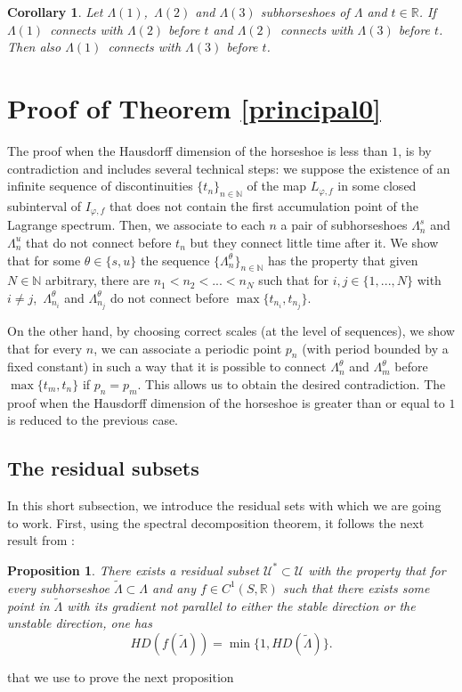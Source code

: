 \documentclass[12pt]{amsart}
\theoremstyle{plain} %
\newtheorem{proposition}[theorem]{Proposition}
\newtheorem{corollary}[theorem]{Corollary}
\theoremstyle{definition} %
\numberwithin{equation}{section}
\begin{document}
 \begin{corollary}\label{connection3}
 Let $\Lambda(1)$,\ $\Lambda(2)$ and $\Lambda(3)$ subhorseshoes of $\Lambda$ and $t\in \mathbb{R}$. If $\Lambda(1)$\ connects with $\Lambda(2)$ before $t$ and $\Lambda(2)$\ connects with $\Lambda(3)$ before $t$. Then also $\Lambda(1)$\ connects with $\Lambda(3)$ before $t$.
 \end{corollary}
 
\section{Proof of Theorem \ref{principal0}}

The proof when the Hausdorff dimension of the horseshoe is less than $1$, is by contradiction and includes several technical steps: we suppose the existence of an infinite sequence of discontinuities $\{t_n\}_{n\in\mathbb{N}}$ of the map $L_{\varphi, f}$ in some closed subinterval of $I_{\varphi,f}$ that does not contain the first accumulation point of the Lagrange spectrum. Then, we associate to each $n$ a pair of subhorseshoes 
$\Lambda^s_n$ and $\Lambda^u_n$ that do not connect before $t_n$ but they connect little time after it. We show that for some $\theta \in \{s,u\}$ the sequence $\{\Lambda^{\theta}_n\}_{n\in\mathbb{N}}$ has the property that given $N\in \mathbb{N}$ arbitrary, there are $n_1<n_2<...<n_N$ such that for $i,j\in  \{1,...,N \}$ with $i\neq j$,\ $\Lambda^{\theta}_{n_i}$ and $\Lambda^{\theta}_{n_j}$ do not connect before $\max \{ t_{n_i}, t_{n_j} \}.$ 

On the other hand, by choosing correct scales (at the level of sequences), we show that for every $n$, we can associate a periodic point $p_n$ (with period bounded by a fixed constant) in such a way that it is possible to connect $\Lambda^{\theta}_n$ and $\Lambda^{\theta}_m$ before $\max \{ t_m, t_n \}$ if $p_n=p_m$. This allows us to obtain the desired contradiction. The proof when the Hausdorff dimension of the horseshoe is greater than or equal to $1$ is reduced to the previous case.

\subsection{The residual subsets} 
In this short subsection, we introduce the residual sets with which we are going to work. First, using the spectral decomposition theorem, it follows the next result from \cite{M50}: 

\begin{proposition}\label{dimension}
There exists a residual subset $\mathcal{U}^*\subset \mathcal{U}$ with the property that for every subhorseshoe $\tilde{\Lambda}\subset \Lambda$ and any $f\in C^1(S,\mathbb{R})$ such that there exists some point in $\tilde{\Lambda}$ with its gradient not parallel to either the stable direction or the unstable direction, one has 
	$$HD(f(\widetilde{\Lambda})) = \min \{1,HD(\widetilde{\Lambda})\}.$$
\end{proposition} 
that we use to prove the next proposition
\end{document}
